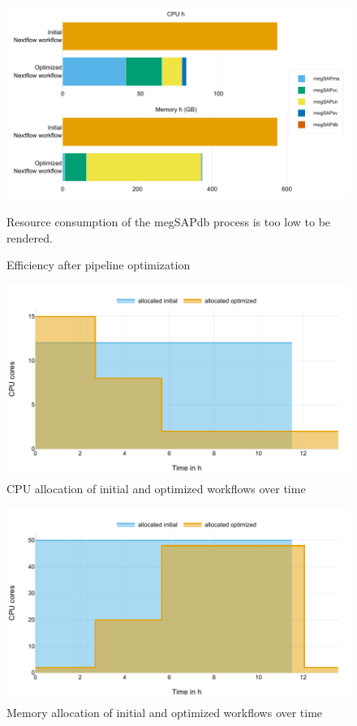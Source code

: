 \begin{figure}[H]
    \centering
	\includegraphics[width=\linewidth,height=\textheight,keepaspectratio]{pipeline_benchmark_efficiency}
	\caption{Efficiency after pipeline optimization}{Resource consumption of the megSAPdb process is too low to be rendered.}
	\label{figure:pipeline_benchmark_efficiency}
\end{figure}

\begin{figure}[H]
    \centering
	\includegraphics[width=\linewidth,height=\textheight,keepaspectratio]{pipeline_benchmark_CPU_compared_aoc}
	\caption{CPU allocation of initial and optimized workflows over time}
	\label{figure:pipeline_cpu_compared_aoc}
\end{figure}

\begin{figure}[H]
    \centering
	\includegraphics[width=\linewidth,height=\textheight,keepaspectratio]{pipeline_benchmark_memory_compared_aoc}
	\caption{Memory allocation of initial and optimized workflows over time}
	\label{figure:pipeline_memory_compared_aoc}
\end{figure}

